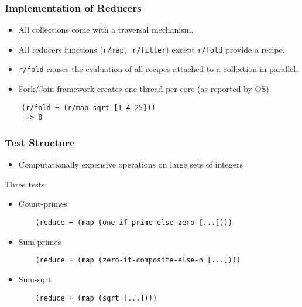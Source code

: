 \documentclass{beamer}
\newcommand{\clocode}[1]{{\texttt {#1}}}
\begin{document}
\begin{frame}[fragile]
\frametitle{Implementation of Reducers}
	\begin{itemize}
	\item All collections come with a traversal mechanism.
	\item All reducers functions (\clocode{r/map, r/filter}) except \clocode{r/fold} provide a recipe.
	\item \clocode{r/fold} causes the evaluation of all recipes attached to a collection in parallel.
	\item Fork/Join framework creates one thread per core (as reported by OS).
	\end{itemize}
	\begin{verbatim}
	(r/fold + (r/map sqrt [1 4 25]))
	 => 8
	\end{verbatim}
\end{frame}
\begin{frame}[fragile]
\frametitle{Test Structure}
	\begin{itemize}
	\item Computationally expensive operations on large sets of integers
	
	\end{itemize}
	Three tests:
	\begin{itemize}
	\item Count-primes
	\begin{verbatim}
	(reduce + (map (one-if-prime-else-zero [...])))
	\end{verbatim}
	\item Sum-primes
	\begin{verbatim}
	(reduce + (map (zero-if-composite-else-n [...])))
	\end{verbatim}
	\item Sum-sqrt
	\begin{verbatim}
	(reduce + (map (sqrt [...])))
	\end{verbatim}
	\end{itemize}
\end{frame}
\end{document}
